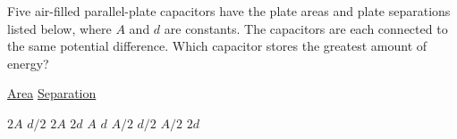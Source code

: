 \begin{questions}\setcounter{question}{26}\question
Five air-filled parallel-plate capacitors have the plate areas and plate separations listed below, where $A$ and $d$ are constants. The capacitors are each connected to the same potential difference. Which capacitor stores the greatest amount of energy?

\tabto{0.75cm}\underline{Area}
\tabto{3.00cm}\underline{Separation}

\begin{choices}
\choice $2 A$   \tabto{2.25cm} $d / 2$
\choice $2 A$   \tabto{2.25cm} $2 d$
\choice $A$     \tabto{2.25cm} $d$
\choice $A / 2$ \tabto{2.25cm} $d / 2$
\choice $A / 2$ \tabto{2.25cm} $2 d$
\end{choices}\end{questions}

